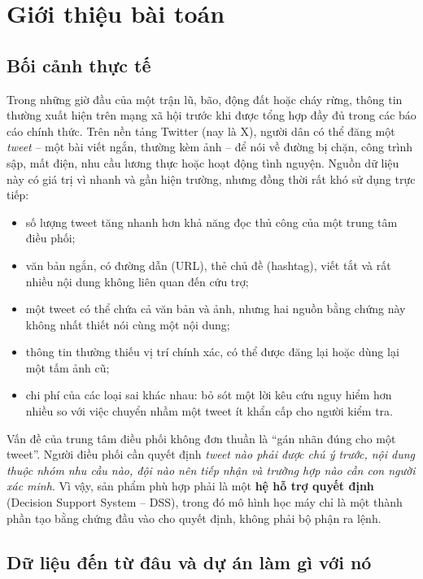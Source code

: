 \chapter{Giới thiệu bài toán}

\section{Bối cảnh thực tế}

Trong những giờ đầu của một trận lũ, bão, động đất hoặc cháy rừng, thông tin
thường xuất hiện trên mạng xã hội trước khi được tổng hợp đầy đủ trong các báo
cáo chính thức. Trên nền tảng Twitter (nay là X), người dân có thể đăng một
\emph{tweet} -- một bài viết ngắn, thường kèm ảnh -- để nói về đường bị chặn,
công trình sập, mất điện, nhu cầu lương thực hoặc hoạt động tình nguyện. Nguồn
dữ liệu này có giá trị vì nhanh và gần hiện trường, nhưng đồng thời rất khó sử
dụng trực tiếp:

\begin{itemize}[leftmargin=*]
  \item số lượng tweet tăng nhanh hơn khả năng đọc thủ công của một trung tâm
        điều phối;
  \item văn bản ngắn, có đường dẫn (URL), thẻ chủ đề (hashtag), viết tắt và rất
        nhiều nội dung không liên quan đến cứu trợ;
  \item một tweet có thể chứa cả văn bản và ảnh, nhưng hai nguồn bằng chứng này
        không nhất thiết nói cùng một nội dung;
  \item thông tin thường thiếu vị trí chính xác, có thể được đăng lại hoặc dùng
        lại một tấm ảnh cũ;
  \item chi phí của các loại sai khác nhau: bỏ sót một lời kêu cứu nguy hiểm hơn
        nhiều so với việc chuyển nhầm một tweet ít khẩn cấp cho người kiểm tra.
\end{itemize}

Vấn đề của trung tâm điều phối không đơn thuần là ``gán nhãn đúng cho một
tweet''. Người điều phối cần quyết định \emph{tweet nào phải được chú ý trước,
nội dung thuộc nhóm nhu cầu nào, đội nào nên tiếp nhận và trường hợp nào cần con
người xác minh}. Vì vậy, sản phẩm phù hợp phải là một \textbf{hệ hỗ trợ quyết
định} (Decision Support System -- DSS), trong đó mô hình học máy chỉ là một
thành phần tạo bằng chứng đầu vào cho quyết định, không phải bộ phận ra lệnh.

\section{Dữ liệu đến từ đâu và dự án làm gì với nó}
\label{sec:scope-data}

